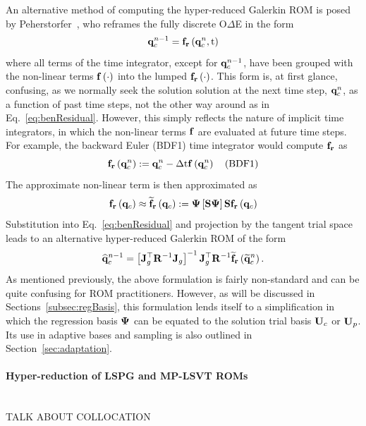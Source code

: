 An alternative method of computing the hyper-reduced Galerkin ROM is posed by Peherstorfer~\cite{Peherstorfer2020Adaptive}, who reframes the fully discrete O$\Delta$E in the form
%
\begin{equation}\label{eq:benResidual}
	\mathbf{q}_{c}^{n-1} = \mathbf{f}_{\mathbf{r}}\left(\mathbf{q}_{c}^{n}, \text{t}\right)
\end{equation}
%
where all terms of the time integrator, except for $\mathbf{q}_{c}^{n - 1}$, have been grouped with the non-linear terms $\mathbf{f} \left(\cdot\right)$ into the lumped $\mathbf{f}_{\mathbf{r}}\left(\cdot\right)$. This form is, at first glance, confusing, as we normally seek the solution solution at the next time step, $\mathbf{q}_{c}^{n}$, as a function of past time steps, not the other way around as in Eq.~\ref{eq:benResidual}. However, this simply reflects the nature of implicit time integrators, in which the non-linear terms $\mathbf{f}$ are evaluated at future time steps. For example, the backward Euler (BDF1) time integrator would compute $\mathbf{f}_{\mathbf{r}}$ as
%
\begin{equation}
	\mathbf{f}_{\mathbf{r}}\left(\mathbf{q}_{c}^{n}\right) := \mathbf{q}_{c}^{n} - \Delta \text{t} \mathbf{f} \left(\mathbf{q}_{c}^{n}\right) \quad \text{(BDF1)}
\end{equation}
%
The approximate non-linear term is then approximated as
%
\begin{equation}
	\rhsResFunc{\consVec} \approx \rhsResApproxFunc{\consVec} \defEq \deimBasis \left[\sampMat \deimBasis \right] \sampMat \rhsResFunc{\consVec}
\end{equation}
%
Substitution into Eq.~\ref{eq:benResidual} and projection by the tangent trial space leads to an alternative hyper-reduced Galerkin ROM of the form
%
\begin{equation}
    \consVecCoef^{\timeIdx-1} = \left[\jacobDecode^\top \resScaleInv \jacobDecode\right]^{-1} \jacobDecode^\top \resScaleInv \rhsResApproxFunc{\consVecRom^{\timeIdx}}.
\end{equation}
%
As mentioned previously, the above formulation is fairly non-standard and can be quite confusing for ROM practitioners. However, as will be discussed in Sections~\ref{subsec:regBasis}, this formulation lends itself to a simplification in which the regression basis $\deimBasis$ can be equated to the solution trial basis $\consTrial$ or $\primTrial$. Its use in adaptive bases and sampling is also outlined in Section~\ref{sec:adaptation}.

\paragraph*{Hyper-reduction of LSPG and MP-LSVT ROMs}\mbox{}\\
%
{\color{red}TALK ABOUT COLLOCATION}

